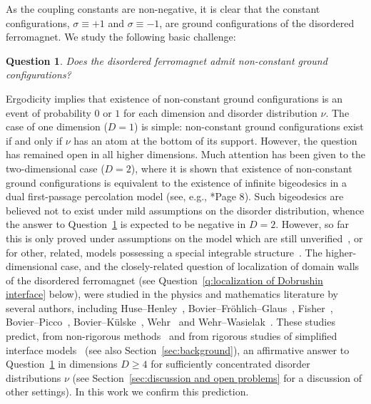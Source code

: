 \documentclass[11pt, reqno]{amsart}
\newtheorem{question}[theorem]{Question}
\numberwithin{equation}{section}
\begin{document}
As the coupling constants are non-negative, it is clear that the constant configurations, $\sigma\equiv +1$ and $\sigma\equiv -1$, are ground configurations of the disordered ferromagnet. We study the following basic challenge:
\begin{question}\label{q:non-constant ground configurations}
Does the disordered ferromagnet admit non-constant ground configurations?
\end{question}
Ergodicity implies that existence of non-constant ground configurations is an event of probability $0$ or $1$ for each dimension and disorder distribution $\nu$. 
The case of one dimension ($D=1$) is simple: 
non-constant ground configurations exist if and only if $\nu$ has an atom at the bottom of its support. 
However, the question has remained open in all higher dimensions. 
Much attention has been given to the two-dimensional case ($D=2$), 
where it is shown that existence of non-constant ground configurations is equivalent to the existence of infinite bigeodesics in a dual first-passage percolation model (see, e.g., \cite{N97}*{Page 8}). 
Such bigeodesics are believed not to exist under mild assumptions on the disorder distribution,  whence the answer to Question~\ref{q:non-constant ground configurations} is expected to be negative in $D=2$. However, so far this is only proved under assumptions on the model which are still unverified~\cite{A20}, or for other, related, models possessing a special integrable structure~\cites{BHS22, BBS20, GJRA21, BS22}. 
The higher-dimensional case, 
and the closely-related question of localization of domain walls of the disordered ferromagnet (see Question~\ref{q:localization of Dobrushin interface} below), were studied in the physics and mathematics literature by several authors, 
including Huse--Henley~\cite{HH85}, 
Bovier--Fr\"ohlich--Glaus~\cite{BFG86}, Fisher~\cite{F86}, Bovier--Picco~\cite{BP91}, Bovier--K\"ulske~\cites{BK, BK96}, Wehr~\cite{W97} and Wehr--Wasielak~\cite{WW16}. 
These studies predict, from non-rigorous methods~\cites{HH85, BFG86, F86} and from rigorous studies of simplified interface models~\cites{BP91, BK} (see also Section~\ref{sec:background}), an affirmative answer to Question~\ref{q:non-constant ground configurations} in dimensions $D\ge 4$ for sufficiently concentrated disorder distributions $\nu$ (see Section~\ref{sec:discussion and open problems} for a discussion of other settings). 
In this work we confirm this prediction.
\end{document}
